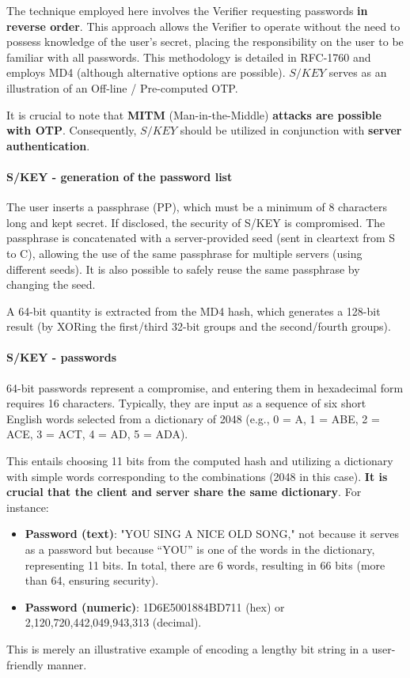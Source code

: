 The technique employed here involves the Verifier requesting passwords \textbf{in reverse order}. This approach allows the Verifier to operate without the need to possess knowledge of the user's secret, placing the responsibility on the user to be familiar with all passwords. This methodology is detailed in RFC-1760 and employs MD4 (although alternative options are possible). \(S/KEY\) serves as an illustration of an Off-line / Pre-computed OTP.

It is crucial to note that \textbf{MITM} (Man-in-the-Middle) \textbf{attacks are possible with OTP}. Consequently, \(S/KEY\) should be utilized in conjunction with \textbf{server authentication}.


\paragraph{S/KEY - generation of the password list}
The user inserts a passphrase (PP), which must be a minimum of 8 characters long and kept secret. If disclosed, the security of S/KEY is compromised. The passphrase is concatenated with a server-provided seed (sent in cleartext from S to C), allowing the use of the same passphrase for multiple servers (using different seeds). It is also possible to safely reuse the same passphrase by changing the seed.

A 64-bit quantity is extracted from the MD4 hash, which generates a 128-bit result (by XORing the first/third 32-bit groups and the second/fourth groups).

\paragraph{S/KEY - passwords}
64-bit passwords represent a compromise, and entering them in hexadecimal form requires 16 characters. Typically, they are input as a sequence of six short English words selected from a dictionary of 2048 (e.g., 0 = A, 1 = ABE, 2 = ACE, 3 = ACT, 4 = AD, 5 = ADA).

This entails choosing 11 bits from the computed hash and utilizing a dictionary with simple words corresponding to the combinations (2048 in this case). \textbf{It is crucial that the client and server share the same dictionary}. For instance:
\begin{itemize}
	\item \textbf{Password (text)}: "YOU SING A NICE OLD SONG," not because it serves as a password but because “YOU” is one of the words in the dictionary, representing 11 bits. In total, there are 6 words, resulting in 66 bits (more than 64, ensuring security).
	\item \textbf{Password (numeric)}: 1D6E5001884BD711 (hex) or 2,120,720,442,049,943,313 (decimal).
\end{itemize}
This is merely an illustrative example of encoding a lengthy bit string in a user-friendly manner.


